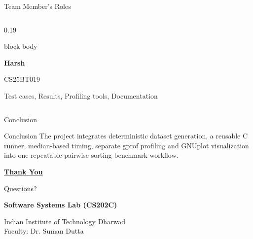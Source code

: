 \documentclass[aspectratio=169,11pt]{beamer}
\begin{document}
\begin{frame}{Team Member's Roles}
\begin{columns}[T,onlytextwidth]
\begin{column}{0.19\textwidth}
\begin{beamercolorbox}[
  wd=\linewidth,
  ht=4.65cm,
  dp=0cm,
  center,
  sep=0.08cm
]{block body}
{

\vspace{0.15cm}
{\bfseries Harsh}

\vspace{0.08cm}
{\scriptsize CS25BT019}

\vspace{0.25cm}
\parbox[t][1.65cm][t]{\linewidth}{
\centering\scriptsize
Test cases, Results,
Profiling tools, Documentation
}
\vfill
}
\end{beamercolorbox}
\end{column}

\end{columns}

\end{frame}


\begin{frame}{Conclusion}
\begin{block}{Conclusion}
The project integrates deterministic dataset generation, a reusable C runner, median-based timing, separate gprof profiling and GNUplot visualization into one repeatable pairwise sorting benchmark workflow.
\end{block}
\centering\vspace{1cm}
{\Huge\color{navy}\bfseries \underline {Thank You}}\par\vspace{0.5cm}
{\Large Questions?}\par\vspace{0.5cm}
\textbf{Software Systems Lab (CS202C)}\par
Indian Institute of Technology Dharwad\\Faculty: Dr. Suman Dutta
\end{frame}
\end{document}
